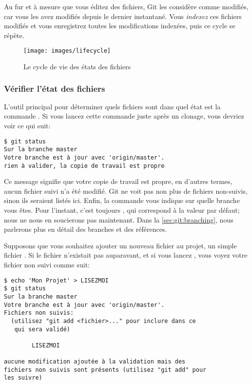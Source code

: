 Au fur et à mesure que vous éditez des fichiers, Git les considère comme modifiés, car vous les avez modifiés depuis le dernier instantané.
Vous \emph{indexez} ces fichiers modifiés et vous enregistrez toutes les modifications indexées, puis ce cycle se répète.

\begin{figure}[H]
  \centering
  \texttt{[image: images/lifecycle]}
  \caption{Le cycle de vie des états des fichiers}
  \label{fig:git:lifecycle}
\end{figure}

\subsubsection{Vérifier l'état des fichiers}
\label{sec:git:checking_status}

L'outil principal pour déterminer quels fichiers sont dans quel état est la commande .
Si vous lancez cette commande juste après un clonage, vous devriez voir ce qui suit:
\begin{Schunk}
\begin{Verbatim}
$ git status
Sur la branche master
Votre branche est à jour avec 'origin/master'.
rien à valider, la copie de travail est propre
\end{Verbatim}
\end{Schunk}

Ce message signifie que votre copie de travail est propre, en d'autres termes, aucun fichier suivi n'a été modifié.
Git ne voit pas non plus de fichiers non-suivis, sinon ils seraient listés ici.
Enfin, la commande vous indique sur quelle branche vous êtes.
Pour l'instant, c'est toujours , qui correspond à la valeur par défaut; nous ne nous en soucierons pas maintenant.
Dans la \autoref{sec:git:branching}, nous parlerons plus en détail des branches et des références.

Supposons que vous souhaitez ajouter un nouveau fichier au projet, un simple fichier .
Si le fichier n'existait pas auparavant, et si vous lancez , vous voyez votre fichier non suivi comme suit:
\begin{Schunk}
\begin{Verbatim}
$ echo 'Mon Projet' > LISEZMOI
$ git status
Sur la branche master
Votre branche est à jour avec 'origin/master'.
Fichiers non suivis:
  (utilisez "git add <fichier>..." pour inclure dans ce
   qui sera validé)

        LISEZMOI

aucune modification ajoutée à la validation mais des
fichiers non suivis sont présents (utilisez "git add" pour
les suivre)
\end{Verbatim}
\end{Schunk}

